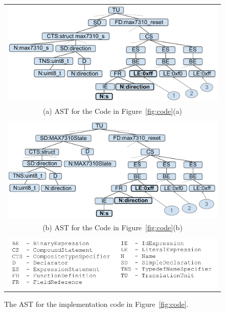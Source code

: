 \begin{figure}[h!]
  \begin{center}
    \begin{tabular}{c}
\begin{minipage}[b]{\linewidth}
  \centering
  \includegraphics[width=0.8\linewidth]{ast1}
\end{minipage}\\
(a) AST for the Code in Figure~\ref{fig:code}(a)\\
\\
\begin{minipage}[b]{\linewidth}
  \centering
  \includegraphics[width=0.8\linewidth]{ast2}
\end{minipage}\\
(b) AST for the Code in Figure~\ref{fig:code}(b)\\
\\
\begin{minipage}[b]{\linewidth}
  \centering
  \includegraphics[width=0.95\linewidth]{ast_legend}
\end{minipage}
\end{tabular}
\caption{The AST for the implementation code in Figure~\ref{fig:code}.}
\label{fig:ast}
\end{center}
\end{figure}


